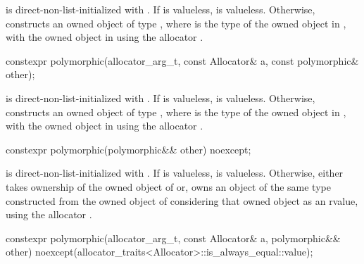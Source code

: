 \begin{itemdescr}
\pnum
\effects
{} is direct-non-list-initialized with
.
If  is valueless,  is valueless.
Otherwise,
constructs an owned object of type , where
 is the type of the owned object in , with
the owned object in  using the allocator .
\end{itemdescr}

%
\begin{itemdecl}
constexpr polymorphic(allocator_arg_t, const Allocator& a, const polymorphic& other);
\end{itemdecl}

\begin{itemdescr}
\pnum
\effects
{} is direct-non-list-initialized with .
If  is valueless,  is valueless.
Otherwise,
constructs an owned object of type , where
 is the type of the owned object in , with
the owned object in  using the allocator .
\end{itemdescr}

%
\begin{itemdecl}
constexpr polymorphic(polymorphic&& other) noexcept;
\end{itemdecl}

\begin{itemdescr}
\pnum
\effects
{} is direct-non-list-initialized with
.
If  is valueless,  is valueless.
Otherwise,
either 
takes ownership of the owned object of  or,
owns an object of the same type
constructed from the owned object of 
considering that owned object as an rvalue,
using the allocator .
\end{itemdescr}

%
\begin{itemdecl}
constexpr polymorphic(allocator_arg_t, const Allocator& a, polymorphic&& other)
  noexcept(allocator_traits<Allocator>::is_always_equal::value);
\end{itemdecl}

